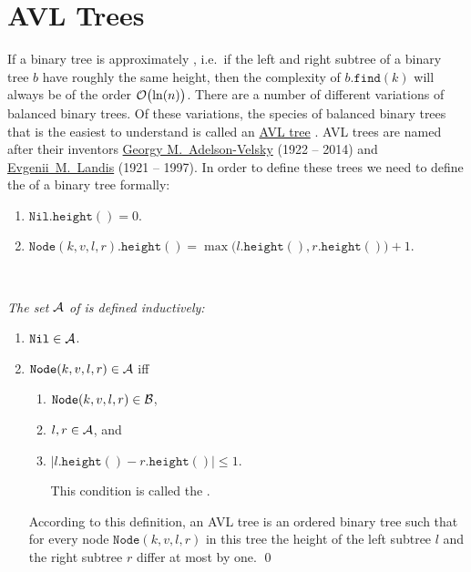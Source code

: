 \section{AVL Trees}
If a binary tree is approximately , i.e.~if the left and right subtree of a binary tree $b$  have
roughly the same height, then the complexity of $b.\texttt{find}(k)$ will always be of the order
$\mathcal{O}\bigl(\ln(n)\bigr)$.  There are a number of different variations of
balanced binary trees.  Of these variations, the species of balanced binary trees that is the easiest to understand is
called an \href{https://en.wikipedia.org/wiki/AVL_tree}{AVL tree} \cite{adelson:62}.  AVL trees are 
named after their inventors \href{https://en.wikipedia.org/wiki/Georgy_Adelson-Velsky}{Georgy M.~Adelson-Velsky} 
(1922 -- 2014) and \href{https://en.wikipedia.org/wiki/Evgenii_Landis}{Evgenii~M.~Landis} (1921 -- 1997).  
In order to define these trees we need to define the  of a binary tree formally:
\begin{enumerate}
\item $\texttt{Nil}.\texttt{height}() = 0$.
\item $\texttt{Node}(k,v,l,r).\texttt{height}() = 
       \max\bigl( l.\texttt{height}(), r.\texttt{height}() \bigr) + 1$. \eox
\end{enumerate}

\begin{Definition} \hspace*{\fill} \\
{\em 
  The set $\mathcal{A}$ of  is defined inductively:
  \begin{enumerate}
  \item $\texttt{Nil} \in \mathcal{A}$.
  \item $\texttt{Node}(k,v,l,r) \in \mathcal{A}$ \quad iff 
        \begin{enumerate}
        \item $\texttt{Node}(k,v,l,r) \in \mathcal{B}$,
        \item $l, r \in \mathcal{A}$, \quad and
        \item $|l.\texttt{height}() - r.\texttt{height}()| \leq 1$.

              This condition is called the .
        \end{enumerate}
        According to this definition, an AVL tree is an ordered binary tree such that for every node
        $\texttt{Node}(k,v,l,r)$ in this tree the height of the left subtree $l$ and the right
        subtree  $r$ differ at most by one.  \qed
  \end{enumerate}
}  
\end{Definition}

